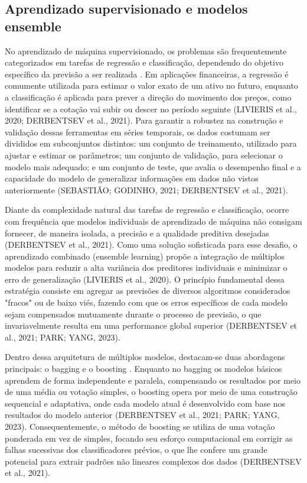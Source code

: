 \subsection{Aprendizado supervisionado e modelos ensemble}
\label{subsec_aprendizado_supervisionado_e_modelos_ensemble}

No aprendizado de máquina supervisionado, os problemas são frequentemente categorizados em tarefas de regressão e classificação, dependendo do objetivo específico da previsão a ser realizada \cite{park2023intelligent}. Em aplicações financeiras, a regressão é comumente utilizada para estimar o valor exato de um ativo no futuro, enquanto a classificação é aplicada para prever a direção do movimento dos preços, como identificar se a cotação vai subir ou descer no período seguinte (LIVIERIS et al., 2020; DERBENTSEV et al., 2021). Para garantir a robustez na construção e validação dessas ferramentas em séries temporais, os dados costumam ser divididos em subconjuntos distintos: um conjunto de treinamento, utilizado para ajustar e estimar os parâmetros; um conjunto de validação, para selecionar o modelo mais adequado; e um conjunto de teste, que avalia o desempenho final e a capacidade do modelo de generalizar informações em dados não vistos anteriormente (SEBASTIÃO; GODINHO, 2021; DERBENTSEV et al., 2021).

Diante da complexidade natural das tarefas de regressão e classificação, ocorre com frequência que modelos individuais de aprendizado de máquina não consigam fornecer, de maneira isolada, a precisão e a qualidade preditiva desejadas (DERBENTSEV et al., 2021). Como uma solução sofisticada para esse desafio, o aprendizado combinado (ensemble learning) propõe a integração de múltiplos modelos para reduzir a alta variância dos preditores individuais e minimizar o erro de generalização (LIVIERIS et al., 2020). O princípio fundamental dessa estratégia consiste em agregar as previsões de diversos algoritmos considerados "fracos" ou de baixo viés, fazendo com que os erros específicos de cada modelo sejam compensados mutuamente durante o processo de previsão, o que invariavelmente resulta em uma performance global superior (DERBENTSEV et al., 2021; PARK; YANG, 2023).

Dentro dessa arquitetura de múltiplos modelos, destacam-se duas abordagens principais: o bagging e o boosting \cite{park2023intelligent}. Enquanto no bagging os modelos básicos aprendem de forma independente e paralela, compensando os resultados por meio de uma média ou votação simples, o boosting opera por meio de uma construção sequencial e adaptativa, onde cada modelo atual é desenvolvido com base nos resultados do modelo anterior (DERBENTSEV et al., 2021; PARK; YANG, 2023). Consequentemente, o método de boosting se utiliza de uma votação ponderada em vez de simples, focando seu esforço computacional em corrigir as falhas sucessivas dos classificadores prévios, o que lhe confere um grande potencial para extrair padrões não lineares complexos dos dados (DERBENTSEV et al., 2021).

